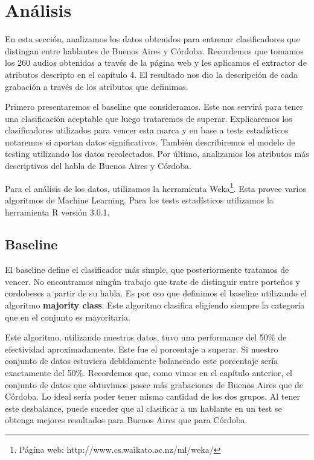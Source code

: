 \chapter{Análisis}

En esta sección, analizamos los datos obtenidos para entrenar clasificadores que distingan entre hablantes de Buenos Aires y Córdoba. Recordemos que tomamos los 260 audios obtenidos a través de la página web y les aplicamos el extractor de atributos descripto en el capítulo 4. El resultado nos dio la descripción de cada grabación a través de los atributos que definimos. 

Primero presentaremos el baseline que consideramos. Este nos servirá para tener una clasificación aceptable que luego trataremos de superar. Explicaremos los clasificadores utilizados para vencer esta marca y en base a tests estadísticos notaremos si aportan datos significativos. También describiremos el modelo de testing utilizando los datos recolectados. Por último, analizamos los atributos más descriptivos del habla de Buenos Aires y Córdoba. 

Para el análisis de los datos, utilizamos la herramienta Weka\footnote{Página web: http://www.cs.waikato.ac.nz/ml/weka/}. Esta provee varios algoritmos de Machine Learning. Para los tests estadísticos utilizamos la herramienta R versión 3.0.1. 

\section{Baseline}

El baseline define el clasificador más simple, que posteriormente tratamos de vencer. No encontramos ningún trabajo que trate de distinguir entre porteños y cordobeses a partir de su habla. Es por eso que definimos el baseline utilizando el algoritmo \textbf{majority class}. Este algoritmo clasifica eligiendo siempre la categoría que en el conjunto es mayoritaria.

Este algoritmo, utilizando nuestros datos, tuvo una performance del 50\% de efectividad aproximadamente. Este fue el porcentaje a superar. Si nuestro conjunto de datos estuviera debidamente balanceado este porcentaje sería exactamente del 50\%. Recordemos que, como vimos en el capítulo anterior, el conjunto de datos que obtuvimos posee más grabaciones de Buenos Aires que de Córdoba. Lo ideal sería poder tener misma cantidad de los dos grupos. Al tener este desbalance, puede suceder que al clasificar a un hablante en un test se obtenga mejores resultados para Buenos Aires que para Córdoba. 

